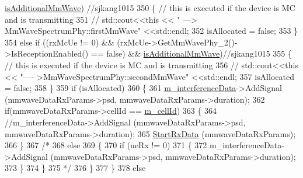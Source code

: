 \begin{DoxyCode}
      \hyperlink{classns3_1_1MmWaveSpectrumPhy_a424e1d78317df52f798d7dee04f4c096}{isAdditionalMmWave}) \textcolor{comment}{//sjkang1015}
350                 \{       \textcolor{comment}{// this is executed if the device is MC and is transmitting}
351                 \textcolor{comment}{//      std::cout<<this << " ---> MmWaveSpectrumPhy::firstMmWave" <<std::endl;}
352                         isAllocated = \textcolor{keyword}{false};
353                 \}
354                 \textcolor{keywordflow}{else} \textcolor{keywordflow}{if} ((rxMcUe != 0) && (rxMcUe->GetMmWavePhy\_2()->IsReceptionEnabled() == \textcolor{keyword}{false}) && 
      \hyperlink{classns3_1_1MmWaveSpectrumPhy_a424e1d78317df52f798d7dee04f4c096}{isAdditionalMmWave})\textcolor{comment}{//sjkang1015}
355                         \{       \textcolor{comment}{// this is executed if the device is MC and is transmitting}
356                 \textcolor{comment}{//      std::cout<<this << "---- >MmWaveSpectrumPhy::secondMmWave" <<std::endl;}
357                                 isAllocated = \textcolor{keyword}{false};
358                         \}
359                 \textcolor{keywordflow}{if} (isAllocated)
360                 \{
361                         \hyperlink{classns3_1_1MmWaveSpectrumPhy_a6fa712af38b75eaf093ca7feaaaa70fe}{m\_interferenceData}->AddSignal (mmwaveDataRxParams->psd, 
      mmwaveDataRxParams->duration);
362                         \textcolor{keywordflow}{if}(mmwaveDataRxParams->cellId == \hyperlink{classns3_1_1MmWaveSpectrumPhy_ac47302ef0f8154064d84adcc0001d77c}{m\_cellId})
363                         \{
364                                 \textcolor{comment}{//m\_interferenceData->AddSignal (mmwaveDataRxParams->psd,
       mmwaveDataRxParams->duration);}
365                                 \hyperlink{classns3_1_1MmWaveSpectrumPhy_a7e46417700c6917e5f5e7d719f756746}{StartRxData} (mmwaveDataRxParams);
366                         \}
367                         \textcolor{comment}{/*}
368 \textcolor{comment}{                        else}
369 \textcolor{comment}{                        \{}
370 \textcolor{comment}{                                if (ueRx != 0)}
371 \textcolor{comment}{                                \{}
372 \textcolor{comment}{                                        m\_interferenceData->AddSignal (mmwaveDataRxParams->psd,
       mmwaveDataRxParams->duration);}
373 \textcolor{comment}{                                \}}
374 \textcolor{comment}{                        \}}
375 \textcolor{comment}{                        */}
376                 \}
377         \}
378         \textcolor{keywordflow}{else}

\end{DoxyCode}
